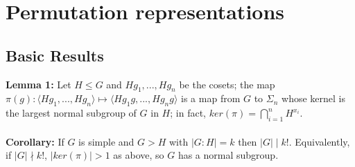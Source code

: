 \chapter{Permutation representations}
\section {Basic Results}
{\bf Lemma 1:} 
Let $H \le G$ and $Hg_1 , ..., Hg_n$ be the cosets; the map
$\pi(g): \langle Hg_1, ..., Hg_n \rangle \mapsto \langle Hg_1 g, ..., Hg_n g \rangle $ 
is a map from $G$ to $\Sigma_n$
whose kernel is the largest normal subgroup of $G$ in $H$; in fact,
$ker(\pi) = \bigcap_{i=1}^n H^{x_i}$.
\\
\\
{\bf Corollary:}  If $G$ is simple and $G > H$ with $|G:H| = k$ then
$|G| \mid k!$.
Equivalently, if $|G| \nmid k!$, $|ker(\pi)| > 1$ as above, so $G$ has
a normal subgroup.
